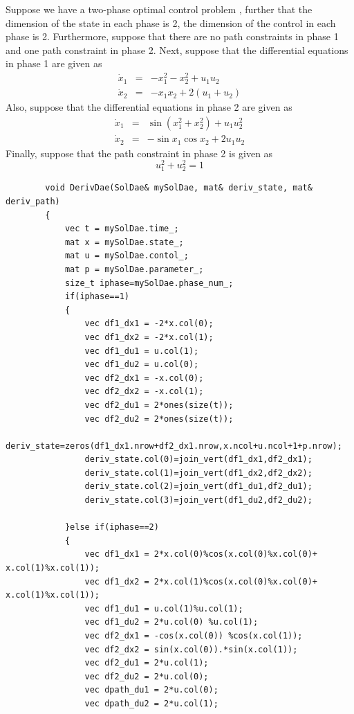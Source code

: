 \documentclass[10pt]{article}
\begin{document}
\begin{itemize}
\begin{frame}
		Suppose we have a two-phase optimal control problem , further that the dimension
		of the state in each phase is 2, the dimension of the control in each
		phase is 2.  Furthermore, suppose that there are no path constraints
		in phase 1 and one path constraint in phase 2.  Next, suppose that
		the differential equations in phase 1 are given as
		\begin{displaymath}
		\begin{array}{lcl}
		\dot {x}_1 & = & -x_1^2-x_2^2 + u_1 u_2 \\
		\dot {x}_2 & = & -x_1x_2 + 2(u_1+u_2)
		\end{array}
		\end{displaymath}
		Also, suppose that the differential equations in phase 2 are given as
		\begin{displaymath}
		\begin{array}{lcl}
		\dot{x}_1 & = & \sin(x_1^2+x_2^2) + u_1 u_2^2 \\
		\dot {x}_2 & = & -\sin x_1 \cos x_2 + 2u_1u_2
		\end{array}
		\end{displaymath}
		Finally, suppose that the path constraint in phase 2 is given as
		\begin{displaymath}
		u_1^2+u_2^2 = 1
		\end{displaymath}
	    \begin{lstlisting}
	    void DerivDae(SolDae& mySolDae, mat& deriv_state, mat& deriv_path)
	    {
		    vec t = mySolDae.time_;
		    mat x = mySolDae.state_;
		    mat u = mySolDae.contol_;
		    mat p = mySolDae.parameter_;
	        size_t iphase=mySolDae.phase_num_;
	        if(iphase==1)
	        {
		        vec df1_dx1 = -2*x.col(0);
		        vec df1_dx2 = -2*x.col(1);
		        vec df1_du1 = u.col(1);
		        vec df1_du2 = u.col(0);
		        vec df2_dx1 = -x.col(0);
		        vec df2_dx2 = -x.col(1);
		        vec df2_du1 = 2*ones(size(t));
		        vec df2_du2 = 2*ones(size(t));
		        deriv_state=zeros(df1_dx1.nrow+df2_dx1.nrow,x.ncol+u.ncol+1+p.nrow);
		        deriv_state.col(0)=join_vert(df1_dx1,df2_dx1);
		        deriv_state.col(1)=join_vert(df1_dx2,df2_dx2);
		        deriv_state.col(2)=join_vert(df1_du1,df2_du1);
		        deriv_state.col(3)=join_vert(df1_du2,df2_du2);
		            
	        }else if(iphase==2)
	        {
		        vec df1_dx1 = 2*x.col(0)%cos(x.col(0)%x.col(0)+ x.col(1)%x.col(1));
		        vec df1_dx2 = 2*x.col(1)%cos(x.col(0)%x.col(0)+ x.col(1)%x.col(1));
		        vec df1_du1 = u.col(1)%u.col(1);
		        vec df1_du2 = 2*u.col(0) %u.col(1);
		        vec df2_dx1 = -cos(x.col(0)) %cos(x.col(1));
		        vec df2_dx2 = sin(x.col(0)).*sin(x.col(1));
		        vec df2_du1 = 2*u.col(1);
		        vec df2_du2 = 2*u.col(0);
		        vec dpath_du1 = 2*u.col(0);
		        vec dpath_du2 = 2*u.col(1);
		        

\end{lstlisting}
\end{frame}
\end{itemize}
\end{document}
